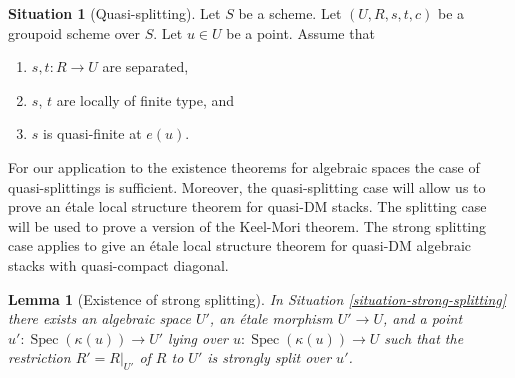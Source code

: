 \documentclass{stacks-project}
\theoremstyle{plain}
\newtheorem{lemma}[subsection]{Lemma}
\theoremstyle{definition}
\newtheorem{situation}[subsection]{Situation}
\theoremstyle{remark}
\numberwithin{equation}{subsection}
\def\Spec{\mathop{\mathrm{Spec}}}
\begin{document}
\begin{situation}[Quasi-splitting]
\label{situation-quasi-splitting}
Let $S$ be a scheme.
Let $(U, R, s, t, c)$ be a groupoid scheme over $S$.
Let $u \in U$ be a point. Assume that
\begin{enumerate}
\item $s, t : R \to U$ are separated,
\item $s$, $t$ are locally of finite type, and
\item $s$ is quasi-finite at $e(u)$.
\end{enumerate}
\end{situation}

\noindent
For our application to the existence theorems for algebraic spaces
the case of quasi-splittings is sufficient. Moreover, the quasi-splitting
case will allow us to prove an \'etale local structure theorem for
quasi-DM stacks. The splitting case will be used to prove a version
of the Keel-Mori theorem. The strong splitting case applies to give
an \'etale local structure theorem for quasi-DM algebraic stacks
with quasi-compact diagonal.

\begin{lemma}[Existence of strong splitting]
\label{lemma-strong-splitting}
In Situation \ref{situation-strong-splitting}
there exists an algebraic space $U'$, an \'etale morphism
$U' \to U$, and a point $u' : \Spec(\kappa(u)) \to U'$
lying over $u : \Spec(\kappa(u)) \to U$
such that the restriction $R' = R|_{U'}$ of $R$ to $U'$
is strongly split over $u'$.
\end{lemma}
\end{document}
